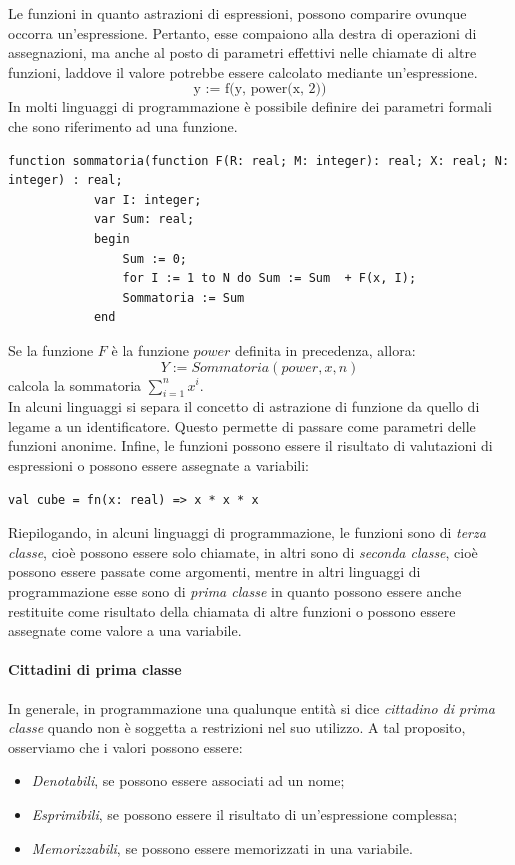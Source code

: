 \documentclass[12pt]{report}
\begin{document}
 	Le funzioni in quanto astrazioni di espressioni, possono comparire ovunque occorra un'espressione. Pertanto, esse compaiono alla destra di operazioni di assegnazioni, ma anche al posto di parametri effettivi nelle chiamate di altre funzioni, laddove il valore potrebbe essere calcolato mediante un'espressione.
 	\[
 	\text{y := f(y, power(x, 2))}
 	\]
 	In molti linguaggi di programmazione è possibile definire dei parametri formali che sono riferimento ad una funzione.
 	\begin{lstlisting}[style=pascalstyle]
 		function sommatoria(function F(R: real; M: integer): real; X: real; N: integer) : real;
 			var I: integer;
 			var Sum: real;
 			begin
 				Sum := 0;
 				for I := 1 to N do Sum := Sum  + F(x, I);
 				Sommatoria := Sum
 			end
 	\end{lstlisting}
 	Se la funzione $F$ è la funzione $power$ definita in precedenza, allora: \[Y := Sommatoria(power, x, n)\] calcola la sommatoria $\sum_{i=1}^{n}x^i$. \\
 	In alcuni linguaggi si separa il concetto di astrazione di funzione da quello di legame a un identificatore. Questo permette di passare come parametri delle funzioni anonime. Infine, le funzioni possono essere il risultato di valutazioni di espressioni o possono essere assegnate a variabili:
 	\begin{lstlisting}[style=mlstyle]
 		val cube = fn(x: real) => x * x * x\end{lstlisting}
 	Riepilogando, in alcuni linguaggi di programmazione, le funzioni sono di \textit{terza classe}, cioè possono essere solo chiamate, in altri sono di \textit{seconda classe}, cioè possono essere passate come argomenti, mentre in altri linguaggi di programmazione esse sono di \textit{prima classe} in quanto possono essere anche restituite come risultato della chiamata di altre funzioni o possono essere assegnate come valore a una variabile.
 	\paragraph{Cittadini di prima classe}
 	In generale, in programmazione una qualunque entità si dice \textit{cittadino di prima classe} quando non è soggetta a restrizioni nel suo utilizzo. A tal proposito, osserviamo che i valori possono essere:
 	\begin{itemize}
 		\item \textit{Denotabili}, se possono essere associati ad un nome;
 		\item \textit{Esprimibili}, se possono essere il risultato di un'espressione complessa;
 		\item \textit{Memorizzabili}, se possono essere memorizzati in una variabile.
 	\end{itemize}
\end{document}
